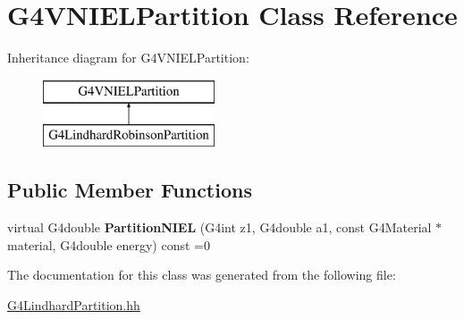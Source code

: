 \hypertarget{classG4VNIELPartition}{\section{G4\-V\-N\-I\-E\-L\-Partition Class Reference}
\label{classG4VNIELPartition}
}
Inheritance diagram for G4\-V\-N\-I\-E\-L\-Partition\-:\begin{figure}[H]
\begin{center}
\leavevmode
\includegraphics[height=2.000000cm]{classG4VNIELPartition}
\end{center}
\end{figure}
\subsection*{Public Member Functions}
\begin{DoxyCompactItemize}
\item 
\hypertarget{classG4VNIELPartition_ad9754615406ab6530ddc19bc11297222}{virtual G4double {\bfseries Partition\-N\-I\-E\-L} (G4int z1, G4double a1, const G4\-Material $\ast$material, G4double energy) const =0}\label{classG4VNIELPartition_ad9754615406ab6530ddc19bc11297222}

\end{DoxyCompactItemize}


The documentation for this class was generated from the following file\-:\begin{DoxyCompactItemize}
\item 
\hyperlink{G4LindhardPartition_8hh}{G4\-Lindhard\-Partition.\-hh}\end{DoxyCompactItemize}
